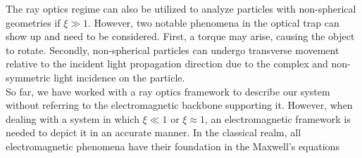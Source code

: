 \documentclass[letterpaper,12pt,oneside]{book}
\begin{document}
The ray optics regime can also be utilized to analyze particles with non-spherical geometries if $\xi \gg 1 $. However, two notable phenomena in the optical trap can show up and need to be considered. First, a torque may arise, causing the object to rotate. Secondly, non-spherical particles can undergo transverse movement relative to the incident light propagation direction due to the complex and non-symmetric light incidence on the particle.
\\So far, we have worked with a ray optics framework to describe our system without referring to the electromagnetic backbone supporting it. However, when dealing with a system in which $\xi \ll 1$ or $\xi \approx 1$, an electromagnetic framework is needed to depict it in an accurate manner.
In the classical realm, all electromagnetic phenomena have their foundation in the Maxwell's equations
\end{document}
